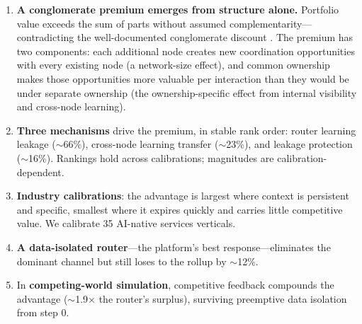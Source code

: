 \documentclass[12pt]{article}
\theoremstyle{definition}
\begin{document}
\begin{enumerate}[leftmargin=*]
\item \textbf{A conglomerate premium emerges from structure alone.} Portfolio value exceeds the sum of parts without assumed complementarity---contradicting the well-documented conglomerate discount \citep{berger1995}. The premium has two components: each additional node creates new coordination opportunities with every existing node (a network-size effect), and common ownership makes those opportunities more valuable per interaction than they would be under separate ownership (the ownership-specific effect from internal visibility and cross-node learning).

\item \textbf{Three mechanisms} drive the premium, in stable rank order: router learning leakage ($\sim$66\%), cross-node learning transfer ($\sim$23\%), and leakage protection ($\sim$16\%). Rankings hold across calibrations; magnitudes are calibration-dependent.

\item \textbf{Industry calibrations}: the advantage is largest where context is persistent and specific, smallest where it expires quickly and carries little competitive value. We calibrate 35 AI-native services verticals.

\item \textbf{A data-isolated router}---the platform's best response---eliminates the dominant channel but still loses to the rollup by $\sim$12\%.

\item In \textbf{competing-world simulation}, competitive feedback compounds the advantage ($\sim$1.9$\times$ the router's surplus), surviving preemptive data isolation from step 0.
\end{enumerate}
\end{document}
